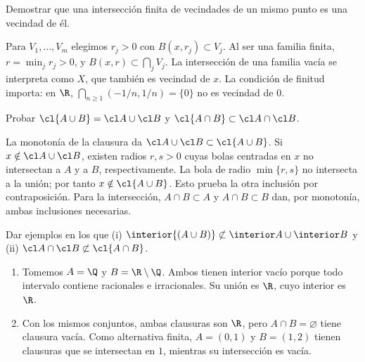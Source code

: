 \begin{ejercicio}
Demostrar que una intersección finita de vecindades de un mismo punto es una vecindad de él.
\end{ejercicio}
\begin{solucion}
Para $V_1,\ldots,V_m$ elegimos $r_j>0$ con $B(x,r_j)\subset V_j$. Al ser una familia finita, $r=\min_jr_j>0$, y $B(x,r)\subset\bigcap_jV_j$. La intersección de una familia vacía se interpreta como $X$, que también es vecindad de $x$. La condición de finitud importa: en $\R$, $\bigcap_{n\ge1}(-1/n,1/n)=\{0\}$ no es vecindad de $0$.
\end{solucion}

\begin{ejercicio}
Probar $\cl{A\cup B}=\cl A\cup\cl B$ y $\cl{A\cap B}\subset\cl A\cap\cl B$.
\end{ejercicio}
\begin{solucion}
La monotonía de la clausura da $\cl A\cup\cl B\subset\cl{A\cup B}$. Si $x\notin\cl A\cup\cl B$, existen radios $r,s>0$ cuyas bolas centradas en $x$ no intersectan a $A$ y a $B$, respectivamente. La bola de radio $\min\{r,s\}$ no intersecta a la unión; por tanto $x\notin\cl{A\cup B}$. Esto prueba la otra inclusión por contraposición. Para la intersección, $A\cap B\subset A$ y $A\cap B\subset B$ dan, por monotonía, ambas inclusiones necesarias.
\end{solucion}

\begin{ejercicio}
Dar ejemplos en los que (i) $\interior{(A\cup B)}\not\subset\interior A\cup\interior B$ y (ii) $\cl A\cap\cl B\not\subset\cl{A\cap B}$.
\end{ejercicio}
\begin{solucion}
\begin{enumerate}[label=(\roman*)]
\item Tomemos $A=\Q$ y $B=\R\setminus\Q$. Ambos tienen interior vacío porque todo intervalo contiene racionales e irracionales. Su unión es $\R$, cuyo interior es $\R$.
\item Con los mismos conjuntos, ambas clausuras son $\R$, pero $A\cap B=\varnothing$ tiene clausura vacía. Como alternativa finita, $A=(0,1)$ y $B=(1,2)$ tienen clausuras que se intersectan en $1$, mientras su intersección es vacía.
\end{enumerate}
\end{solucion}

